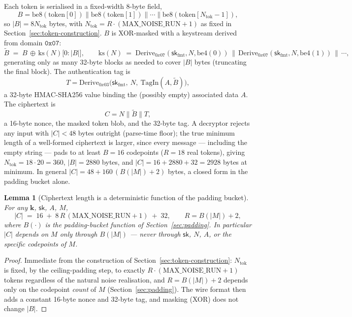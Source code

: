 \documentclass[11pt,a4paper]{article}
\newtheorem{lemma}[theorem]{Lemma}
\begin{document}
Each token is serialised in a fixed-width 8-byte field,
\[
  B = \mathrm{be8}(\mathrm{token}[0]) \| \mathrm{be8}(\mathrm{token}[1]) \| \cdots \| \mathrm{be8}(\mathrm{token}[N_{\mathrm{tok}}-1]),
\]
so $|B| = 8N_{\mathrm{tok}}$ bytes, with $N_{\mathrm{tok}} = R\cdot(\mathrm{MAX\_NOISE\_RUN}+1)$
as fixed in Section~\ref{sec:token-construction}. $B$ is XOR-masked with a
keystream derived from domain $\texttt{0x07}$:
\[
  \widetilde{B} \;=\; B \,\oplus\, \mathrm{ks}(N)\bigl[0 : |B|\bigr],
  \qquad
  \mathrm{ks}(N) \;=\; \mathrm{Derive}_{0x07}(\mathsf{sk}_{\mathrm{fmt}}, N, \mathrm{be4}(0)) \,\|\,
  \mathrm{Derive}_{0x07}(\mathsf{sk}_{\mathrm{fmt}}, N, \mathrm{be4}(1)) \,\|\, \cdots,
\]
generating only as many 32-byte blocks as needed to cover $|B|$ bytes
(truncating the final block). The authentication tag is
\[
  T = \mathrm{Derive}_{0x03}\bigl(\mathsf{sk}_{\mathrm{fmt}},\ N,\ \mathrm{TagIn}(A,\widetilde{B})\bigr),
\]
a 32-byte HMAC-SHA256 value binding the (possibly empty) associated data
$A$. The ciphertext is
\[
  C = N \| \widetilde{B} \| T,
\]
a 16-byte nonce, the masked token blob, and the 32-byte tag. A decryptor
rejects any input with $|C| < 48$ bytes outright (parse-time floor); the
true minimum length of a well-formed ciphertext is larger, since every
message — including the empty string — pads to at least $B=16$ codepoints
($R=18$ real tokens), giving
$N_{\mathrm{tok}} = 18\cdot20 = 360$, $|B|=2880$ bytes, and
$|C| = 16+2880+32 = 2928$ bytes at minimum. In general
$|C| = 48 + 160\,(B(|M|)+2)$ bytes, a closed form in the padding bucket
alone.

\begin{lemma}[Ciphertext length is a deterministic function of the padding bucket]
\label{lem:length-det}
For any $\mathbf{k}$, $\mathsf{sk}$, $A$, $M$,
\[
  |C| \;=\; 16 \;+\; 8\,R\,(\mathrm{MAX\_NOISE\_RUN}+1) \;+\; 32,
  \qquad R = B(|M|) + 2,
\]
where $B(\cdot)$ is the padding-bucket function of
Section~\ref{sec:padding}. In particular $|C|$ depends on $M$ only through
$B(|M|)$ — never through $\mathsf{sk}$, $N$, $A$, or the specific
codepoints of $M$.
\end{lemma}

\begin{proof}
Immediate from the construction of Section~\ref{sec:token-construction}:
$N_{\mathrm{tok}}$ is fixed, by the ceiling-padding step, to exactly
$R\cdot(\mathrm{MAX\_NOISE\_RUN}+1)$ tokens regardless of the natural
noise realisation, and $R = B(|M|)+2$ depends only on the codepoint
\emph{count} of $M$ (Section~\ref{sec:padding}). The wire format then adds
a constant 16-byte nonce and 32-byte tag, and masking (XOR) does not
change $|B|$.
\end{proof}
\end{document}
